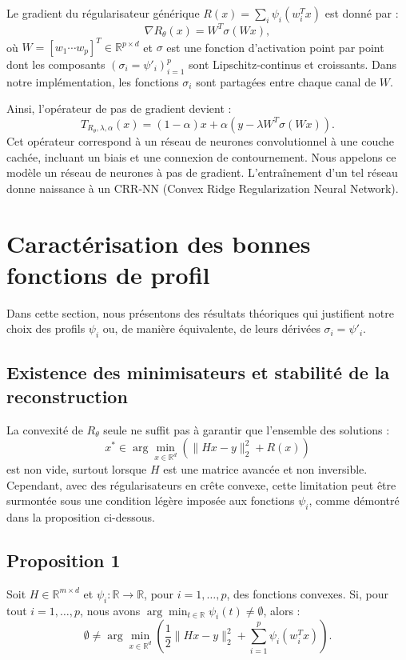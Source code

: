 \documentclass[a4paper, 12pt]{report} %
\begin{document}
Le gradient du régularisateur générique \( R(x) = \sum_{i} \psi_i(w_i^T x) \) est donné par :  
\[
\nabla R_\theta(x) = W^T \sigma(Wx),
\]
où \( W = [w_1 \cdots w_p]^T \in \mathbb{R}^{p \times d} \) et \( \sigma \) est une fonction d’activation point par point dont les composants \( (\sigma_i = \psi'_i)_{i=1}^p \) sont Lipschitz-continus et croissants. Dans notre implémentation, les fonctions \( \sigma_i \) sont partagées entre chaque canal de \( W \).

Ainsi, l’opérateur de pas de gradient devient :  
\[
T_{R_\theta,\lambda,\alpha}(x) = (1 - \alpha)x + \alpha \left( y - \lambda W^T \sigma(Wx) \right).
\]
Cet opérateur correspond à un réseau de neurones convolutionnel à une couche cachée, incluant un biais et une connexion de contournement. Nous appelons ce modèle un réseau de neurones à pas de gradient. L’entraînement d’un tel réseau donne naissance à un CRR-NN (Convex Ridge Regularization Neural Network).

\section{Caractérisation des bonnes fonctions de profil}

Dans cette section, nous présentons des résultats théoriques qui justifient notre choix des profils \( \psi_i \) ou, de manière équivalente, de leurs dérivées \( \sigma_i = \psi'_i \).

\subsection{Existence des minimisateurs et stabilité de la reconstruction}

La convexité de \( R_\theta \) seule ne suffit pas à garantir que l'ensemble des solutions :  
\[
x^* \in \arg \min_{x \in \mathbb{R}^d} \left( \| Hx - y \|_2^2 + R(x) \right)
\]  
est non vide, surtout lorsque \( H \) est une matrice avancée et non inversible. Cependant, avec des régularisateurs en crête convexe, cette limitation peut être surmontée sous une condition légère imposée aux fonctions \( \psi_i \), comme démontré dans la proposition ci-dessous.

\subsection*{Proposition 1}

Soit \( H \in \mathbb{R}^{m \times d} \) et \( \psi_i : \mathbb{R} \to \mathbb{R} \), pour \( i = 1, \ldots, p \), des fonctions convexes. Si, pour tout \( i = 1, \ldots, p \), nous avons \( \arg \min_{t \in \mathbb{R}} \psi_i(t) \neq \emptyset \), alors :  
\[
\emptyset \neq \arg \min_{x \in \mathbb{R}^d} \left( \frac{1}{2} \| Hx - y \|_2^2 + \sum_{i=1}^p \psi_i(w_i^T x) \right).
\]
\end{document}
